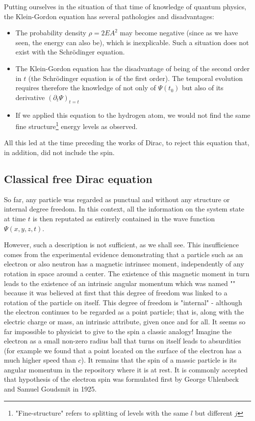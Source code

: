 	Putting ourselves in the situation of that time of knowledge of quantum physics, the Klein-Gordon equation has several pathologies and disadvantages:
	\begin{itemize}
		\item The probability density $\rho=2EA^2$ may become negative (since as we have seen, the energy can also be), which is inexplicable. Such a situation does not exist with the Schrödinger equation.
		
		\item The Klein-Gordon equation has the disadvantage of being of the second order in $t$ (the Schrödinger equation is of the first order). The temporal evolution requires therefore the knowledge of not only of $\Psi(t_0)$ but also of its derivative $(\partial_t \Psi)_{t=t}$

		\item If we applied this equation to the hydrogen atom, we would not find the same fine structure\footnote{"Fine-structure" refers to splitting of levels with the same $l$ but different $j$} energy levels as observed.		
	\end{itemize}
	All this led at the time preceding the works of Dirac, to reject this equation that, in addition, did not include the spin.

	\pagebreak	
	\subsection{Classical free Dirac equation}\label{classical free dirac equation}
	So far, any particle was regarded as punctual and without any structure or internal degree freedom. In this context, all the information on the system state at time $t$ is then reputated as entirerly contained in the wave function $\Psi(x,y,z,t)$.

	However, such a description is not sufficient, as we shall see. This insufficience comes from the experimental evidence demonstrating that a particle such as an electron or also neutron has a magnetic intrinsec moment, independently of any rotation in space around a center. The existence of this magnetic moment in turn leads to the existence of an intrinsic angular momentum which was named "" because it was believed at first that this degree of freedom was linked to a rotation of the particle on itself. This degree of freedom is "internal" - although the electron continues to be regarded as a point particle; that is, along with the electric charge or mass, an intrinsic attribute, given once and for all. It seems so far impossible to physicist to give to the spin a classic analogy! Imagine the electron as a small non-zero radius ball that turns on itself leads to absurdities (for example we found that a point located on the surface of the electron has a much higher speed than $c$). It remains that the spin of a massic particle is its angular momentum in the repository where it is at rest. It is commonly accepted that hypothesis of the electron spin was formulated first by George Uhlenbeck and Samuel Goudsmit in 1925.

